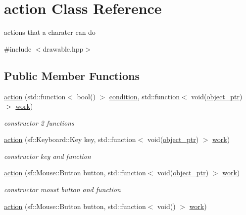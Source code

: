 \hypertarget{classaction}{}\section{action Class Reference}
\label{classaction}


actions that a charater can do  




{\ttfamily \#include $<$drawable.\+hpp$>$}

\subsection*{Public Member Functions}
\begin{DoxyCompactItemize}
\item 
\hyperlink{classaction_a481b1b2e3892600143fd7b2db4ac5729}{action} (std\+::function$<$ bool() $>$ \hyperlink{classaction_a949abf979a5255f54e88a6a4273afebe}{condition}, std\+::function$<$ void(\hyperlink{drawable_8hpp_aab5add95f06d2ba25dbfed8eb07274fa}{object\+\_\+ptr}) $>$ \hyperlink{classaction_a711a393fce3b3b22930b651e24eda6c3}{work})
\begin{DoxyCompactList}\small\item\em constructor 2 functions \end{DoxyCompactList}\item 
\hyperlink{classaction_a504531cbc56e9c4a60b4e5d40bc018a6}{action} (sf\+::\+Keyboard\+::\+Key key, std\+::function$<$ void(\hyperlink{drawable_8hpp_aab5add95f06d2ba25dbfed8eb07274fa}{object\+\_\+ptr}) $>$ \hyperlink{classaction_a711a393fce3b3b22930b651e24eda6c3}{work})
\begin{DoxyCompactList}\small\item\em constructor key and function \end{DoxyCompactList}\item 
\hyperlink{classaction_abf43e8dfaeca2df9d356fbfd4d1790ba}{action} (sf\+::\+Mouse\+::\+Button button, std\+::function$<$ void(\hyperlink{drawable_8hpp_aab5add95f06d2ba25dbfed8eb07274fa}{object\+\_\+ptr}) $>$ \hyperlink{classaction_a711a393fce3b3b22930b651e24eda6c3}{work})
\begin{DoxyCompactList}\small\item\em constructor moust button and function \end{DoxyCompactList}\item 
\hyperlink{classaction_a55a91caa9803002fa7ddd6e9e9e46dc6}{action} (sf\+::\+Mouse\+::\+Button button, std\+::function$<$ void() $>$ \hyperlink{classaction_a711a393fce3b3b22930b651e24eda6c3}{work})

\end{DoxyCompactItemize}
